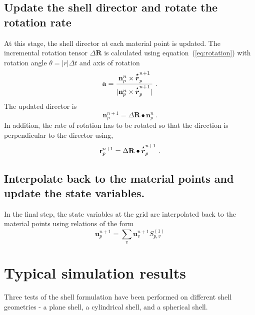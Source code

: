    \subsection{ Update the shell director and rotate the rotation rate}
       At this stage, the shell director at each material point is updated.
       The incremental rotation tensor $\Delta\mathbf{R}$ is calculated using
       equation~(\ref{eq:rotation}) with
       rotation angle $\theta = |r|\Delta t$ and axis of rotation
       \begin{equation}
         \mathbf{a} = \frac{\mathbf{n}_p^n \times 
                        \overset{\star}{\boldsymbol{r}}_p^{n+1}}
                        {|\mathbf{n}_p^n \times 
                        \overset{\star}{\boldsymbol{r}}_p^{n+1}|}~.
       \end{equation}
       The updated director is
       \begin{equation}
         \mathbf{n}_p^{n+1} = \Delta\mathbf{R}\bullet \mathbf{n}_p^{n}~.
       \end{equation}
       In addition, the rate of rotation has to be rotated so that the 
       direction is perpendicular to the director using,
       \begin{equation}
         \mathbf{r}_p^{n+1} = \Delta\mathbf{R}\bullet
            \overset{\star}{\boldsymbol{r}}_p^{n+1}~.
       \end{equation}
    \subsection{ Interpolate back to the material points and update the state
           variables.}
       In the final step, the state variables at the grid are interpolated
       back to the material points using relations of the form
       \begin{equation}
         \mathbf{u}_p^{n+1} = \sum_v \mathbf{u}_v^{n+1} S^{(1)}_{p,v}
       \end{equation}

  \section{Typical simulation results}
  Three tests of the shell formulation have been performed on different
  shell geometries - a plane shell, a cylindrical shell, and a spherical
  shell.
